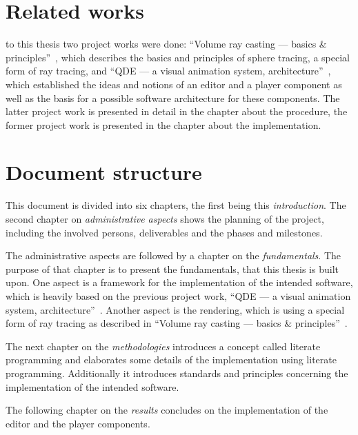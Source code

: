 \documentclass[%
    a4paper,    %
    justified,  %
    nobib,      %
    openany     %
]{tufte-book}
\begin{document}
\section{Related works}
\label{sec:related-works}

 to this thesis two project works were done:
\enquote{Volume ray casting --- basics \&
principles}~\cite{osterwalder_volume_2016}, which describes the basics and
principles of sphere tracing, a special form of ray tracing, and \enquote{QDE
--- a visual animation system, architecture}~\cite{osterwalder_qde_2016}, which
established the ideas and notions of an editor and a player component as well as
the basis for a possible software architecture for these components. The latter
project work is presented in detail in the chapter about the procedure, the
former project work is presented in the chapter about the implementation.

\section{Document structure}
\label{sec:document-structure}

This document is divided into six chapters, the first being this \textit{introduction}. The
second chapter on \textit{administrative aspects} shows the planning of the
project, including the involved persons, deliverables and the phases and
milestones.

The administrative aspects are followed by a chapter on the
\textit{fundamentals}. The purpose of that chapter is to present the
fundamentals, that this thesis is built upon. One aspect is a framework for the
implementation of the intended software, which is heavily based on the previous
project work, \enquote{QDE --- a visual animation system, architecture}~\cite{osterwalder_qde_2016}. Another aspect is the rendering,
which is using a special form of ray tracing as described in ``Volume ray
casting --- basics \& principles''~\cite{osterwalder_volume_2016}.

The next chapter on the \textit{methodologies} introduces a concept called
literate programming and elaborates some details of the implementation using
literate programming. Additionally it introduces standards and principles
concerning the implementation of the intended software.

The following chapter on the \textit{results} concludes on the implementation
of the editor and the player components.
\end{document}
